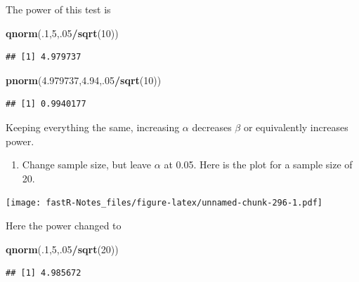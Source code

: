 \documentclass[]{book}
\newenvironment{Shaded}{\begin{snugshade}}{\end{snugshade}}
\newcommand{\KeywordTok}[1]{\textcolor[rgb]{0.13,0.29,0.53}{\textbf{#1}}}
\newcommand{\DecValTok}[1]{\textcolor[rgb]{0.00,0.00,0.81}{#1}}
\newcommand{\FloatTok}[1]{\textcolor[rgb]{0.00,0.00,0.81}{#1}}
\newcommand{\OperatorTok}[1]{\textcolor[rgb]{0.81,0.36,0.00}{\textbf{#1}}}
\newcommand{\NormalTok}[1]{#1}
\providecommand{\tightlist}{%
  \setlength{\itemsep}{0pt}\setlength{\parskip}{0pt}}
\theoremstyle{definition}
\theoremstyle{definition}
\theoremstyle{definition}
\theoremstyle{remark}
\begin{document}
The power of this test is

\begin{Shaded}
\begin{Highlighting}[]
\KeywordTok{qnorm}\NormalTok{(.}\DecValTok{1}\NormalTok{,}\DecValTok{5}\NormalTok{,.}\DecValTok{05}\OperatorTok{/}\KeywordTok{sqrt}\NormalTok{(}\DecValTok{10}\NormalTok{))}
\end{Highlighting}
\end{Shaded}

\begin{verbatim}
## [1] 4.979737
\end{verbatim}

\begin{Shaded}
\begin{Highlighting}[]
\KeywordTok{pnorm}\NormalTok{(}\FloatTok{4.979737}\NormalTok{,}\FloatTok{4.94}\NormalTok{,.}\DecValTok{05}\OperatorTok{/}\KeywordTok{sqrt}\NormalTok{(}\DecValTok{10}\NormalTok{))}
\end{Highlighting}
\end{Shaded}

\begin{verbatim}
## [1] 0.9940177
\end{verbatim}

Keeping everything the same, increasing \(\alpha\) decreases \(\beta\)
or equivalently increases power.

\begin{enumerate}
\def\labelenumi{\arabic{enumi}.}
\setcounter{enumi}{1}
\tightlist
\item
  Change sample size, but leave \(\alpha\) at 0.05. Here is the plot for
  a sample size of 20.
\end{enumerate}

\texttt{[image: fastR-Notes\_files/figure-latex/unnamed-chunk-296-1.pdf]}

Here the power changed to

\begin{Shaded}
\begin{Highlighting}[]
\KeywordTok{qnorm}\NormalTok{(.}\DecValTok{1}\NormalTok{,}\DecValTok{5}\NormalTok{,.}\DecValTok{05}\OperatorTok{/}\KeywordTok{sqrt}\NormalTok{(}\DecValTok{20}\NormalTok{))}
\end{Highlighting}
\end{Shaded}

\begin{verbatim}
## [1] 4.985672
\end{verbatim}
\end{document}
